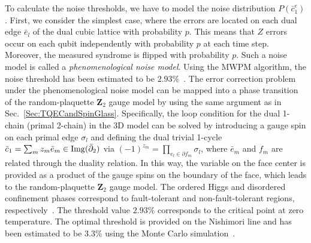 To calculate the noise thresholds, we have to model the noise distribution $P(\bar c_1^e)$.
First, we consider the simplest case, where the errors are located on each dual edge $\bar e_l$ of the dual cubic lattice with probability $p$.
This means that $Z$ errors occur on each qubit independently with probability $p$
at each time step.
Moreover, the measured syndrome is flipped with probability $p$.
Such a noise model is called a {\it phenomenological noise model}.
Using the MWPM algorithm, the noise threshold has been estimated to be $2.93\%$~\cite{Wang}.
The error correction problem under the phenomenological noise model can be mapped into a phase transition of the random-plaquette $\mathbf{Z}_2$ gauge model by using the same argument as in Sec.~\ref{Sec:TQECandSpinGlass}.
Specifically, the loop condition for the dual 1-chain (primal 2-chain) in the 3D model can be solved by introducing a gauge spin on each primal edge $\sigma _l$
and defining the dual trivial 1-cycle
$\bar c_1 = \sum _{m} z_m \bar e_m \in {\rm Img}(\bar \partial _2)$
via $(-1)^{z_m} = \prod _{e_l \in \partial f_m} \sigma _l$,
where $\bar e_m$ and $f_m$ are related through the duality relation.
In this way,
the variable on the face center
is provided as a product of the gauge spins on the boundary of the face, which leads to the random-plaquette $\mathbf{Z}_2$ gauge model.
The ordered Higgs and disordered confinement phases correspond to fault-tolerant and non-fault-tolerant regions, respectively~\cite{Dennis}.
The threshold value $2.93\%$ corresponds to the critical point at zero temperature.
The optimal threshold is provided on the Nishimori line and has been estimated to be $3.3\%$ using the Monte Carlo simulation~\cite{Ohno}.

